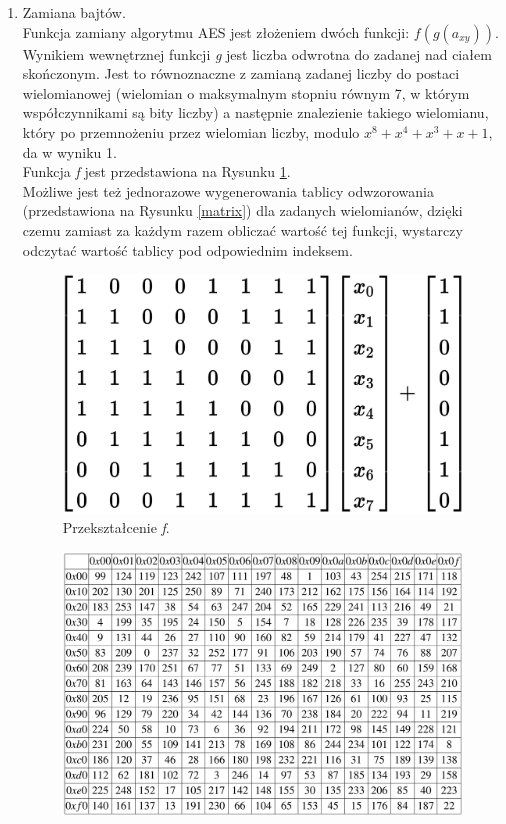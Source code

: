 \begin{enumerate}
	\item Zamiana bajtów. \\
			Funkcja zamiany algorytmu AES jest złożeniem dwóch funkcji: $f(g(a_{xy})).$ \\
			Wynikiem wewnętrznej funkcji \textit{g} jest liczba odwrotna do zadanej nad ciałem skończonym.
			Jest to równoznaczne z zamianą zadanej liczby do postaci wielomianowej (wielomian o maksymalnym 
			stopniu równym 7, w którym współczynnikami są bity liczby) a następnie znalezienie takiego
			wielomianu, który po przemnożeniu przez wielomian liczby, modulo $x^8+x^4+x^3+x+1$, da w wyniku 1. \\
			Funkcja \textit{f} jest przedstawiona na Rysunku \ref{ff}. \\
			Możliwe jest też jednorazowe wygenerowania tablicy odwzorowania (przedstawiona na Rysunku \ref{matrix}) dla zadanych wielomianów,
			dzięki czemu zamiast za każdym razem obliczać wartość tej funkcji, wystarczy odczytać wartość tablicy
			pod odpowiednim indeksem. 
			\begin{figure}[t]
			    \centering
			    \includegraphics[scale=0.5]{content/images/affin}
				\caption{Przekształcenie \textit{f}.}
				\label{ff}
			\end{figure}
			\begin{figure}[t]
			    \centering
			    \includegraphics[width=\textwidth]{content/images/sbox}

\end{figure}
\end{enumerate}
